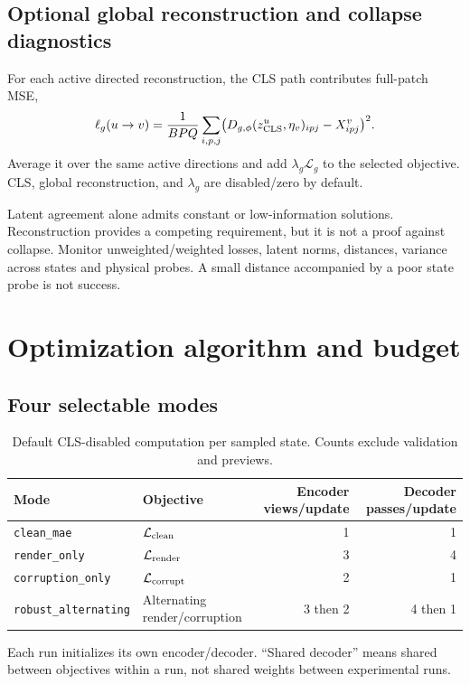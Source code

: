 \documentclass[11pt,a4paper]{article}
\newcommand{\code}[1]{\nolinkurl{#1}}
\newcommand{\Lc}{\mathcal{L}}
\begin{document}
\subsection{Optional global reconstruction and collapse diagnostics}
For each active directed reconstruction, the CLS path contributes full-patch MSE,
\begin{equation}
\ell_g(u\to v)=\frac{1}{BPQ}\sum_{i,p,j}
\bigl(D_{g,\phi}(z^u_{\rm CLS},\eta_v)_{ipj}-X^v_{ipj}\bigr)^2.
\end{equation}
Average it over the same active directions and add $\lambda_g\Lc_g$ to the selected
objective. CLS, global reconstruction, and $\lambda_g$ are disabled/zero by default.

Latent agreement alone admits constant or low-information solutions. Reconstruction
provides a competing requirement, but it is not a proof against collapse. Monitor
unweighted/weighted losses, latent norms, distances, variance across states and
physical probes. A small distance accompanied by a poor state probe is not success.

\section{Optimization algorithm and budget}
\subsection{Four selectable modes}
\begin{table}[htbp]\centering\small
\begin{tabularx}{\linewidth}{lXrr}
\toprule Mode & Objective & Encoder views/update & Decoder passes/update \\\midrule
\code{clean_mae} & $\Lc_{\rm clean}$ & 1 & 1 \\
\code{render_only} & $\Lc_{\rm render}$ & 3 & 4 \\
\code{corruption_only} & $\Lc_{\rm corrupt}$ & 2 & 1 \\
\code{robust_alternating} & Alternating render/corruption & 3 then 2 & 4 then 1 \\\bottomrule
\end{tabularx}
\caption{Default CLS-disabled computation per sampled state. Counts exclude validation and previews.}
\end{table}
Each run initializes its own encoder/decoder. ``Shared decoder'' means shared
between objectives within a run, not shared weights between experimental runs.
\end{document}

